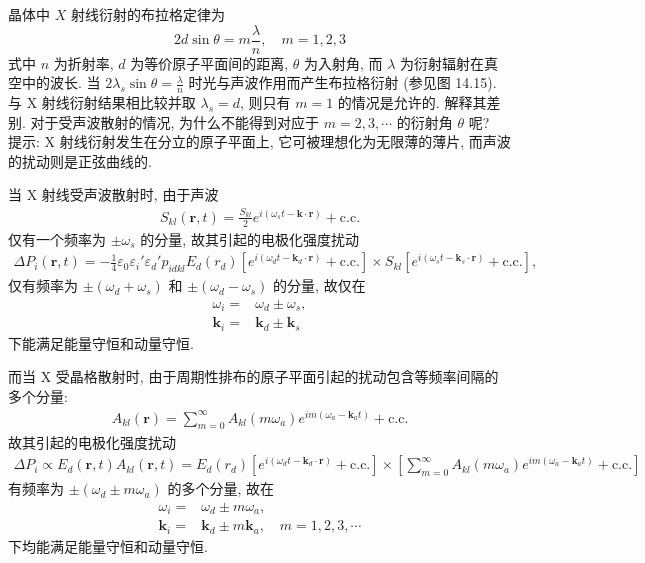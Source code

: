 \documentclass[twoside]{note}
\begin{document}
\begin{exe}
    晶体中 $X$ 射线衍射的布拉格定律为
    \[
        2d\sin\theta=m\frac{\lambda}{n},\quad m=1,2,3
    \]
    式中 $n$ 为折射率, $d$ 为等价原子平面间的距离, $\theta$ 为入射角, 而 $\lambda$ 为衍射辐射在真空中的波长. 当 $2\lambda_s\sin\theta=\frac{\lambda}{n}$ 时光与声波作用而产生布拉格衍射 (参见图 14.15). 与 X 射线衍射结果相比较并取 $\lambda_s=d$, 则只有 $m=1$ 的情况是允许的. 解释其差别. 对于受声波散射的情况, 为什么不能得到对应于 $m=2,3,\cdots$ 的衍射角 $\theta$ 呢?\\
    提示: X 射线衍射发生在分立的原子平面上, 它可被理想化为无限薄的薄片, 而声波的扰动则是正弦曲线的.
\end{exe}
\begin{sol}
    当 X 射线受声波散射时, 由于声波
    \begin{align}
        S_{kl}(\bm{r},t)=\frac{S_{kl}}{2}e^{i(\omega_st-\bm{k}\cdot\bm{r})}+\text{c.c.}
    \end{align}
    仅有一个频率为 $\pm\omega_s$ 的分量, 故其引起的电极化强度扰动
    \begin{align}
        \Delta P_i(\bm{r},t)=-\frac{1}{4}\varepsilon_0\varepsilon_i'\varepsilon_d'p_{idkl}E_d(r_d)[e^{i(\omega_dt-\bm{k}_d\cdot\bm{r})}+\text{c.c.}]\times S_{kl}[e^{i(\omega_st-\bm{k}_s\cdot\bm{r})}+\text{c.c.}],
    \end{align}
    仅有频率为 $\pm(\omega_d+\omega_s)$ 和 $\pm(\omega_d-\omega_s)$ 的分量, 故仅在
    \begin{align}
        \omega_i=&\omega_d\pm\omega_s,\\
        \bm{k}_i=&\bm{k}_d\pm\bm{k}_s
    \end{align}
    下能满足能量守恒和动量守恒.

    而当 X 受晶格散射时, 由于周期性排布的原子平面引起的扰动包含等频率间隔的多个分量:
    \begin{align}
        A_{kl}(\bm{r})=\sum_{m=0}^{\infty}A_{kl}(m\omega_a)e^{im(\omega_a-\bm{k}_at)}+\text{c.c.}
    \end{align}
    故其引起的电极化强度扰动
    \begin{align}
        \Delta P_i\propto E_d(\bm{r},t)A_{kl}(\bm{r},t)=E_d(r_d)[e^{i(\omega_dt-\bm{k}_d\cdot\bm{r})}+\text{c.c.}]\times\left[\sum_{m=0}^{\infty}A_{kl}(m\omega_a)e^{im(\omega_a-\bm{k}_at)}+\text{c.c.}\right]
    \end{align}
    有频率为 $\pm(\omega_d\pm m\omega_a)$ 的多个分量, 故在
    \begin{align}
        \omega_i=&\omega_d\pm m\omega_a,\\
        \bm{k}_i=&\bm{k}_d\pm m\bm{k}_a,\quad m=1,2,3,\cdots
    \end{align}
    下均能满足能量守恒和动量守恒.
\end{sol}
\end{document}
